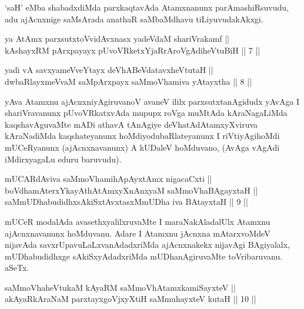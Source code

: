 \begin{artha}
`saH' eMba shabadxdiMda parxkaqtavAda Atamxnanunx parAmashiRsuvudu,
adu ajAcnxnige saMsArada anathaR saMbaMdhavu tiLiyuvudakAkxgi.
\end{artha}

\begin{shl}
ya AtAmx parxsutxtoV\s vidAvxnasx yadeVdaM shariVrakamf || \\
kAshayxRM pArxpayayx pUvoVRketxYjaRrAroVgAdiheVtuBiH \hfill || 7 ||
  
\end{shl}

\begin{shl}
yadi vA savxyameVveYtayx deVhABeVdatavxheVtutaH || \\
dwbaRlayxmeVvaM saMpArxpayx saMmoVhamiva yAtayxtha \hfill || 8 ||
  
\end{shl}

\begin{artha}
yAva Atamxnu ajAcnxniyAgiruvanoV avaneV ililx parxsutxtanAgidudx yAvAga
I shariVravanunx pUvoVRkatxvAda mupupx roVga muMtAda kAraNagaLiMda
kaqshavAguvaMte mADi athavA tAnAgiye deVhatAdAtamxyXviruva kAraNadiMda
kaqshateyanunx hoMdiyo\break dubaRlateyanunx I riVtiyAgihoMdi mUCeRyanunx
(ajAcnxnavanunx) A kUDaleV hoMduvano,  (AvAga vAgAdi iMdirxyagaLu eduru
baruvudu).
\end{artha}

\begin{shl}
mUCARdAviva saMmoVhamihApAyxtAmx nigacaCxti || \\
boVdhamAterxYkayAthAtAmxyXnAnxyaM saMmoVhaBAgayxtaH ||  \\
saMmUDhabudidhxsAkiSxtAvxtasxMmUDha iva BAtayxtaH \hfill || 9 ||
  
\end{shl}

\begin{artha}
mUCeR modalAda avasethxyalilxruvaMte I maraNakAladalUlx Atamxnu
ajAcnxnavanunx hoMduvanu. Adare I Atamxnu jAcnxna mAtarxvoMdeV
nijavAda savxrUpavuLaLxvanAdadxriMda ajAcnxnakekx nijavAgi BAgiyalalx,
mUDhabudidhxge sAkiSxyAdadxriMda mUDhanAgiruvaMte toVribaruvanu. aSeTx.
\end{artha}


\begin{shl}
saMmoVhaheVtukaM kAyaRM saMmoVhAtamxkamiSayxteV ||  \\
akAyaRkAraNaM parxtayxgoVjxyXtiH saMmuhayxteV kutaH \hfill || 10 ||
  
\end{shl}

